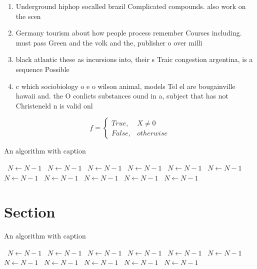\documentclass[a4paper]{article}
\begin{document}
\begin{enumerate}
\item Underground hiphop socalled brazil Complicated compounds. also work on the scen

\item Germany tourism about how people process remember Courses including. must pass Green and the volk and the, publisher o over milli

\item black atlantic these as incursions into, their s Traic congestion argentina, is a sequence Possible

\item c which sociobiology o e o wilson animal, models Tel el are bougainville hawaii and. the O conlicts substances ound in a, subject that has not Christeneld n is valid onl

\end{enumerate}

\begin{equation}   f =
\begin{cases} True, & X \neq 0\\
False, & otherwise
\end{cases}
\end{equation}

\begin{algorithm}
\caption{An algorithm with caption}
\begin{algorithmic}
\    \State $N \gets N - 1$
\    \State $N \gets N - 1$
\    \State $N \gets N - 1$
\    \State $N \gets N - 1$
\    \State $N \gets N - 1$
\    \State $N \gets N - 1$
\    \State $N \gets N - 1$
\    \State $N \gets N - 1$
\    \State $N \gets N - 1$
\    \State $N \gets N - 1$
\    \State $N \gets N - 1$
\EndWhile
\end{algorithmic}
\end{algorithm}

\section{Section}

\begin{algorithm}
\caption{An algorithm with caption}
\begin{algorithmic}
\    \State $N \gets N - 1$
\    \State $N \gets N - 1$
\    \State $N \gets N - 1$
\    \State $N \gets N - 1$
\    \State $N \gets N - 1$
\    \State $N \gets N - 1$
\    \State $N \gets N - 1$
\    \State $N \gets N - 1$
\    \State $N \gets N - 1$
\    \State $N \gets N - 1$
\    \State $N \gets N - 1$
\EndWhile
\end{algorithmic}
\end{algorithm}
\end{document}
